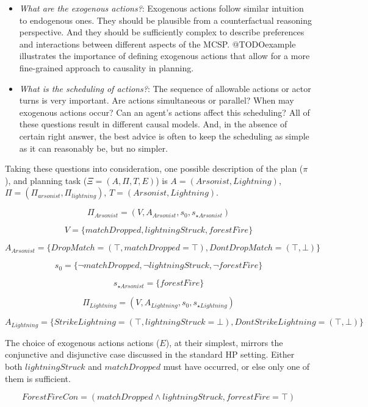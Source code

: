 \documentclass{article}
\theoremstyle{plain}
\theoremstyle{definition}
\begin{document}
\begin{itemize}
\item \textit{What are the exogenous actions?}: Exogenous actions follow similar intuition to endogenous ones. They should be plausible from a counterfactual reasoning perspective. And they should be sufficiently complex to describe preferences and interactions between different aspects of the MCSP. @TODOexample illustrates the importance of defining exogenous actions that allow for a more fine-grained approach to causality in planning.

\item \textit{What is the scheduling of actions?}: The sequence of allowable actions or actor turns is very important. Are actions simultaneous or parallel? When may exogenous actions occur? Can an agent's actions affect this scheduling? All of these questions result in different causal models. And, in the absence of certain right answer, the best advice is often to keep the scheduling as simple as it can reasonably be, but no simpler.

\end{itemize}

Taking these questions into consideration, one possible description of the plan ($\pi$), and planning task ($\Xi = (A, \Pi, T, E)$) is $A=(Arsonist, Lightning)$, $\Pi=(\Pi_{arsonist}, \Pi_{lightning})$, $T=(Arsonist, Lightning)$.

\[
\Pi_{Arsonist} = (V, A_{Arsonist}, s_0, s_{\star Arsonist})
\]

\[
V = \{matchDropped, lightningStruck, forestFire\}
\]

\[
A_{Arsonist} = \{ DropMatch = (\top, matchDropped = \top), DontDropMatch = (\top, \bot) \}
\]

\[
s_0 = \{\lnot matchDropped, \lnot lightningStruck, \lnot forestFire \}
\]

\[
s_{\star Arsonist} = \{ forestFire \}
\]

\[
\Pi_{Lightning} = (V, A_{Lightning}, s_0, s_{\star Lightning})
\]

\[
A_{Lightning}=\{ StrikeLightning = (\top, lightningStruck=\bot), DontStrikeLightning = (\top, \bot) \}
\]

The choice of exogenous actions actions ($E$), at their simplest, mirrors the conjunctive and disjunctive case discussed in the standard HP setting. Either both $lightningStruck$ and $matchDropped$ must have occurred, or else only one of them is sufficient.

\[
ForestFireCon = ( matchDropped \land lightningStruck, forrestFire = \top )
\]
\end{document}
